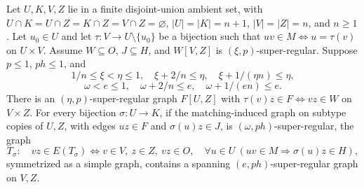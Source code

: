 \begin{lemma}
Let $U,K,V,Z$ lie in a finite disjoint-union ambient set, with
$U\cap K=U\cap Z=K\cap Z=V\cap Z=\varnothing$,
$|U|=|K|=n+1$, $|V|=|Z|=n$, and $n\ge1$. Let $u_0\in U$ and let
$\tau:V\to U\setminus\{u_0\}$ be a bijection such that
$uv\in M\Longleftrightarrow u=\tau(v)$ on $U\times V$.
Assume $W\subseteq O$, $J\subseteq H$, and $W[V,Z]$ is
$(\xi,p)$-super-regular. Suppose $p\le1$, $ph\le1$, and
\[
1/n\le\xi<\eta\le1,\quad
\xi+2/n\le\eta,\quad \xi+1/(\eta n)\le\eta,
\]
\[
\omega<e\le1,\quad \omega+2/n\le e,\quad
\omega+1/(en)\le e.
\]
There is an $(\eta,p)$-super-regular graph $F[U,Z]$ with
$\tau(v)z\in F\Longleftrightarrow vz\in W$ on $V\times Z$.
For every bijection $\sigma:U\to K$, if the matching-induced graph on
subtype copies of $U,Z$, with edges $uz\in F$ and $\sigma(u)z\in J$,
is $(\omega,ph)$-super-regular, the graph
\[
T_\sigma:\quad vz\in E(T_\sigma)\Longleftrightarrow
v\in V,\ z\in Z,\ vz\in O,\quad
\forall u\in U\ (uv\in M\Rightarrow\sigma(u)z\in H),
\]
symmetrized as a simple graph, contains a spanning
$(e,ph)$-super-regular graph on $V,Z$.
\end{lemma}
